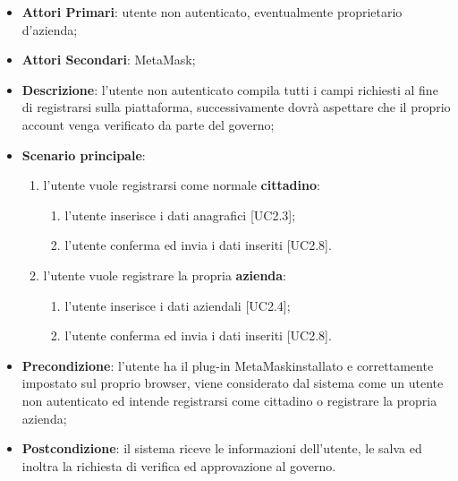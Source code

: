 \begin{itemize}
	\item \textbf{Attori Primari}: utente non autenticato, eventualmente proprietario d'azienda;
	\item \textbf{Attori Secondari}: MetaMask\glosp;
	\item \textbf{Descrizione}: l'utente non autenticato compila tutti i campi richiesti al fine di registrarsi sulla piattaforma, successivamente dovrà aspettare che il proprio account venga verificato da parte del governo\glo;
	\item \textbf{Scenario principale}: 
	
	\begin{enumerate}[label=\alph*.]
		
		\item l'utente vuole registrarsi come normale \textbf{cittadino}: 
		\begin{enumerate}[label=\roman*.]
			\item l'utente inserisce i dati anagrafici [UC2.3];
			\item l'utente conferma ed invia i dati inseriti [UC2.8].
		\end{enumerate}
		
		
		\item l'utente vuole registrare la propria \textbf{azienda}:
		\begin{enumerate}[label=\roman*.]
			\item l'utente inserisce i dati aziendali [UC2.4];
			\item l'utente conferma ed invia i dati inseriti [UC2.8].
		\end{enumerate}
		
		
		
	\end{enumerate}
	\item \textbf{Precondizione}: l'utente ha il plug-in MetaMask\glosp installato e correttamente impostato sul proprio browser, viene considerato dal sistema come un utente non autenticato ed intende registrarsi come cittadino o registrare la propria azienda; 
	\item \textbf{Postcondizione}: il sistema riceve le informazioni dell'utente, le salva ed inoltra la richiesta di verifica ed approvazione al governo\glo.
	
\end{itemize}
